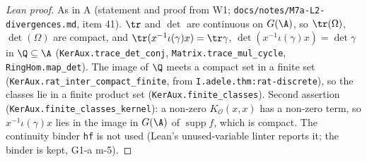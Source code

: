 \begin{proof}[Lean proof]
As in A (statement and proof from W1; \texttt{docs/notes/M7a-L2-divergences.md}, item 41). $\tr$ and $\det$ are continuous on $G(\A)$, so $\tr(\Omega)$, $\det(\Omega)$ are compact, and $\tr(x^{-1}\iota(\gamma)x)=\tr\gamma$, $\det(x^{-1}\iota(\gamma)x)=\det\gamma$ in $\Q\subseteq\A$ (\texttt{KerAux.trace\_det\_conj}, \texttt{Matrix.trace\_mul\_cycle}, \texttt{RingHom.map\_det}). The image of $\Q$ meets a compact set in a finite set (\texttt{KerAux.rat\_inter\_compact\_finite}, from \texttt{I.adele.thm:rat-discrete}), so the classes lie in a finite product set (\texttt{KerAux.finite\_classes}). Second assertion (\texttt{KerAux.finite\_classes\_kernel}): a non-zero $K_{\mathcal O}(x,x)$ has a non-zero term, so $x^{-1}\iota(\gamma)x$ lies in the image in $G(\A)$ of $\operatorname{supp}f$, which is compact. The continuity binder \texttt{hf} is not used (Lean's unused-variable linter reports it; the binder is kept, G1-a m-5).
\end{proof}

